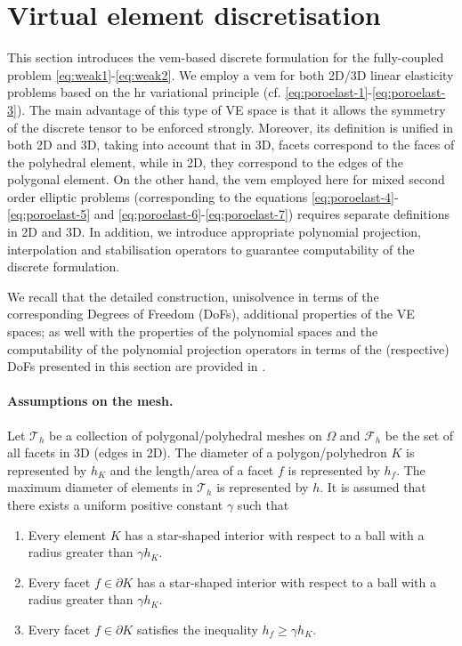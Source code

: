 \documentclass[fleqn,a4paper]{cas-sc}
\newcommand{\0}{\boldsymbol{0}}
\newcommand\cT{\mathcal{T}}
\newcommand\cF{\mathcal{F}}
\numberwithin{equation}{section}
\numberwithin{figure}{section}
\begin{document}
\section{Virtual element discretisation}\label{sec:discrete}
This section introduces the \gls{vem}-based discrete formulation for the fully-coupled problem \eqref{eq:weak1}-\eqref{eq:weak2}. We employ a \gls{vem} for both 2D/3D linear elasticity problems based on the \gls{hr} variational principle (cf. \eqref{eq:poroelast-1}-\eqref{eq:poroelast-3}). The main advantage of this type of VE space is that it allows the symmetry of the discrete tensor to be enforced strongly. Moreover, its definition is unified in both 2D and 3D, taking into account that in 3D, facets correspond to the faces of the polyhedral element, while in 2D, they correspond to the edges of the polygonal element. On the other hand, the \gls{vem} employed here for mixed second order elliptic problems (corresponding to the equations \eqref{eq:poroelast-4}-\eqref{eq:poroelast-5} and \eqref{eq:poroelast-6}-\eqref{eq:poroelast-7})   requires separate definitions in 2D and 3D. In addition, we introduce appropriate polynomial projection, interpolation and stabilisation operators to guarantee computability of the discrete formulation. 

We recall that the detailed construction, unisolvence in terms of the corresponding {Degrees of Freedom} (DoFs), additional properties of the VE spaces; as well with the properties of the polynomial spaces and the computability of the polynomial projection operators in terms of the (respective) DoFs presented in this section are provided in \cite{artioli18,visinoni24,beirao16,beirao16b}.

\paragraph{Assumptions on the mesh.} Let $\cT_h$ be a collection of polygonal/polyhedral meshes on $\Omega$ and $\cF_h$ be the set of all facets in 3D (edges in 2D). The diameter of a polygon/polyhedron $K$ is represented by $h_K$ and the length/area of a facet $f$ is represented by $h_f$. The maximum diameter of elements in $\cT_h$ is represented by $h$. It is assumed that there exists a uniform positive constant {$\gamma$} such that
\begin{enumerate}[label={\textbf{(A\arabic*)}}, align=left, leftmargin=*, labelwidth=!, labelsep=1em]
    \item \label{A1} Every element $K$ has a star-shaped interior with respect to a ball with a radius greater than {$\gamma h_K$}. 
    \item \label{A2} Every facet $f\in \partial K$ has a star-shaped interior with respect to a ball with a radius greater than {$\gamma h_K$}.
    \item \label{A3} Every facet $f\in \partial K$ satisfies the inequality {$h_f \geq \gamma h_K$}.
\end{enumerate}
\end{document}
